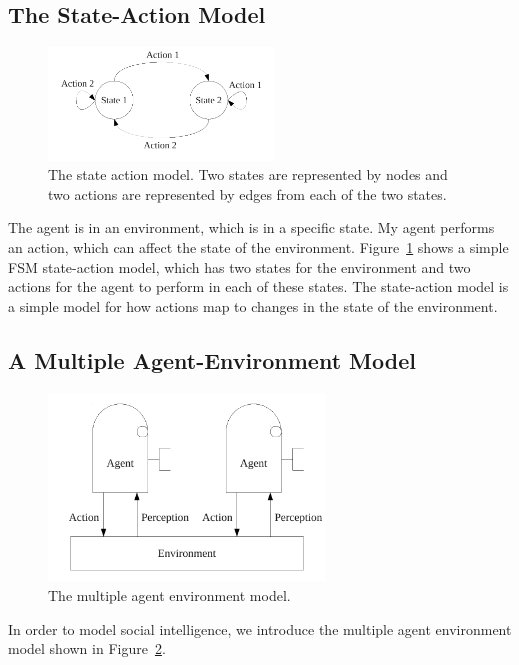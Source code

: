 \subsection{The State-Action Model}
\label{sec:state_action_model}

\begin{figure}[bth]
  \center
  \includegraphics[width=6cm]{gfx/state_action}
  \caption[The state-action model]{The state action model.  Two states
    are represented by nodes and two actions are represented by edges
    from each of the two states.}
  \label{fig:state_action}
\end{figure}

The agent is in an environment, which is in a specific state.  My
agent performs an action, which can affect the state of the
environment.  Figure~\ref{fig:state_action} shows a simple \ac{FSM}
state-action model, which has two states for the environment and two
actions for the agent to perform in each of these states.  The
state-action model is a simple model for how actions map to changes in
the state of the environment.


\subsection{A Multiple Agent-Environment Model}

\begin{figure}[bth]
  \center
  \includegraphics[height=5cm]{gfx/multiple_agent_environment}
  \caption[The multiple agent environment model]{The multiple agent environment model.}
  \label{fig:multiple_agent_environment}
\end{figure}

In order to model social intelligence, we introduce the multiple agent
environment model shown in
Figure~\ref{fig:multiple_agent_environment}.



